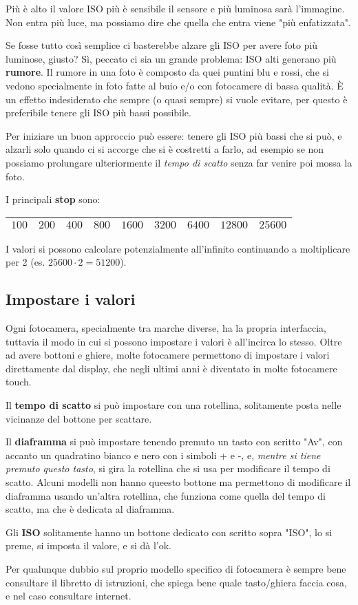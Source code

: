 Più è alto il valore ISO più è sensibile il sensore e più luminosa sarà l'immagine.\\
\nb Non entra più luce, ma possiamo dire che quella che entra viene "più enfatizzata".

Se fosse tutto così semplice ci basterebbe alzare gli ISO per avere foto più luminose, giusto? Sì, peccato ci sia un grande problema: ISO alti generano più \textbf{rumore}.
Il rumore in una foto è composto da quei puntini blu e rossi, che si vedono specialmente in foto fatte al buio e/o con fotocamere di bassa qualità. È un effetto indesiderato che sempre (o quasi sempre) si vuole evitare,
per questo è preferibile tenere gli ISO più bassi possibile.

Per iniziare un buon approccio può essere: tenere gli ISO più bassi che si può, e alzarli solo quando ci si accorge che si è costretti a farlo, ad esempio se non possiamo prolungare ulteriormente il \textit{tempo di scatto} senza far venire poi mossa la foto.

I principali \textbf{stop} sono:
\begin{table}[h]
    \centering
    \begin{tabular}{|l|l|l|l|l|l|l|l|l|}
        \hline
        $100$ & $200$ & $400$ & $800$ & $1600$ & $3200$ & $6400$ & $12800$ & $25600$\\
        \hline
    \end{tabular}
\end{table}

I valori si possono calcolare potenzialmente all'infinito continuando a moltiplicare per 2 (es. $25600 \cdot 2 = 51200$).



\subsection{Impostare i valori} \label{subsec:setvalori}
Ogni fotocamera, specialmente tra marche diverse, ha la propria interfaccia, tuttavia il modo in cui si possono impostare i valori è all'incirca lo stesso.
Oltre ad avere bottoni e ghiere, molte fotocamere permettono di impostare i valori direttamente dal display, che negli ultimi anni è diventato in molte fotocamere touch.

Il \textbf{tempo di scatto} si può impostare con una rotellina, solitamente posta nelle vicinanze del bottone per scattare.

Il \textbf{diaframma} si può impostare tenendo premuto un tasto con scritto "Av", con accanto un quadratino bianco e nero con i simboli + e -, e, \textit{mentre si tiene premuto questo tasto}, si gira la rotellina che si usa per modificare il tempo di scatto.
Alcuni modelli non hanno queesto bottone ma permettono di modificare il diaframma usando un'altra rotellina, che funziona come quella del tempo di scatto, ma che è dedicata al diaframma.

Gli \textbf{ISO} solitamente hanno un bottone dedicato con scritto sopra "ISO", lo si preme, si imposta il valore, e si dà l'ok.

Per qualunque dubbio sul proprio modello specifico di fotocamera è sempre bene consultare il libretto di istruzioni, che spiega bene quale tasto/ghiera faccia cosa, e nel caso consultare internet.